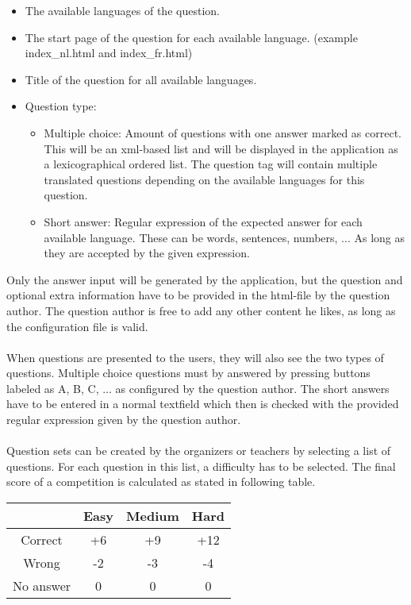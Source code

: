 	\begin{itemize}
		\item The available languages of the question.
		\item The start page of the question for each available language.
		(example index\_nl.html and index\_fr.html)
  		\item Title of the question for all available languages.
  		\item Question type:
  		\begin{itemize}
  			\item Multiple choice: Amount of questions with one answer marked as correct.
  			This will be an xml-based list and will be displayed in the application as a
  			lexicographical ordered list.
  			The question tag will contain multiple translated questions depending on the
  			available languages for this question.
  			\item Short answer: Regular expression of the expected answer for each
  			available language. These can be words, sentences, numbers, ... As long as
  			they are accepted by the given expression.
  		\end{itemize}
	\end{itemize}
	Only the answer input will be generated by the application, but the question and
	optional extra information have to be provided in the html-file by the question author.
	The question author is free to add any other content he likes, as long as the
	configuration file is valid. \\
	\\
	When questions are presented to the users, they will also see the two types of
	questions. Multiple choice questions must by answered by pressing buttons labeled as
	A, B, C, ... as configured by the question author. The short answers have to be
	entered in a normal textfield which then is checked with the provided regular
	expression given by the question author.\\
	\\
	Question sets can be created by the organizers or teachers by selecting a list of questions.
	For each question in this list, a difficulty has to be selected. The final score of a
	competition is calculated as stated in following table.\\
	\begin{tabular}{| c| c| c| c| }
	\hline
	  & Easy & Medium & Hard \\
	\hline
	  Correct & +6 & +9 & +12 \\
	\hline
	  Wrong & -2 & -3 & -4 \\
	\hline
	  No answer & 0 & 0 & 0 \\
	\hline
	\end{tabular}\\ \\
